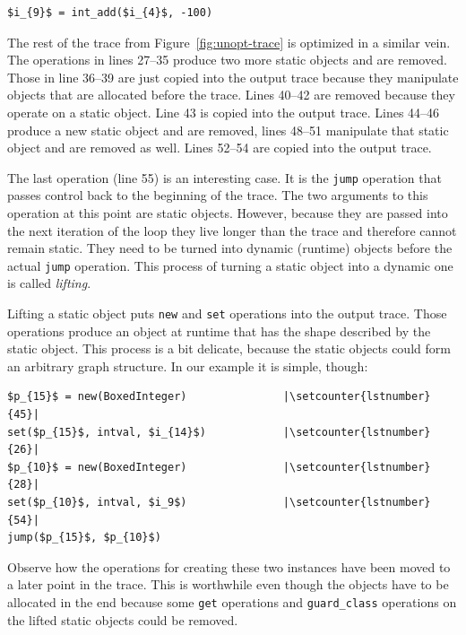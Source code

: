 \documentclass{sigplanconf}
\begin{document}
\begin{lstlisting}[mathescape,xleftmargin=20pt,numbers=right,escapechar=|, firstnumber=26,basicstyle=\setstretch{1.1}\ttfamily\scriptsize]
$i_{9}$ = int_add($i_{4}$, -100)
\end{lstlisting}

The rest of the trace from Figure~\ref{fig:unopt-trace} is optimized in a
similar vein. The operations in lines 27--35 produce two more static objects and
are removed. Those in line 36--39 are just copied into the output trace because they
manipulate objects that are allocated before the trace. Lines 40--42 are removed
because they operate on a static object. Line 43 is copied into the output trace.
Lines 44--46 produce a new static object and are removed, lines 48--51 manipulate
that static object and are removed as well. Lines 52--54 are copied into the output
trace.

The last operation (line 55) is an interesting case. It is the \lstinline{jump}
operation that passes control back to the beginning of the trace. The two
arguments to this operation at this point are static objects. However, because
they are passed into the next iteration of the loop they live longer than the trace
and therefore cannot remain static. They need to be turned into dynamic
(runtime) objects before the actual \lstinline{jump} operation. This process of
turning a static object into a dynamic one is called \emph{lifting}.

Lifting a static object puts \lstinline{new} and \lstinline{set} operations into
the output trace. Those operations produce an object at runtime that has the
shape described by the static object. This process is a bit delicate,
because the static objects could form an arbitrary graph structure. In our
example it is simple, though:

\begin{lstlisting}[mathescape,xleftmargin=20pt,numbers=right,escapechar=|, firstnumber=44,basicstyle=\setstretch{1.1}\ttfamily\scriptsize]
$p_{15}$ = new(BoxedInteger)               |\setcounter{lstnumber}{45}|
set($p_{15}$, intval, $i_{14}$)            |\setcounter{lstnumber}{26}|
$p_{10}$ = new(BoxedInteger)               |\setcounter{lstnumber}{28}|
set($p_{10}$, intval, $i_9$)               |\setcounter{lstnumber}{54}|
jump($p_{15}$, $p_{10}$)
\end{lstlisting}


Observe how the operations for creating these two instances have been moved to a
later point in the trace. This is worthwhile even though the objects have to be
allocated in the end because some \lstinline{get} operations and
\lstinline{guard_class} operations on the lifted static objects could be
removed.
\end{document}
